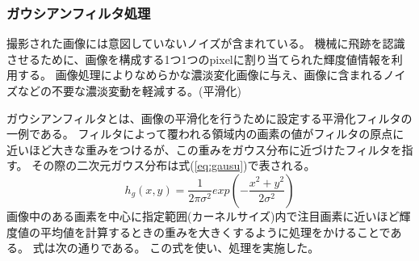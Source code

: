 \documentclass[12pt,a4paper]{jarticle}
\begin{document}
\subsubsection{ガウシアンフィルタ処理}
撮影された画像には意図していないノイズが含まれている。
機械に飛跡を認識させるために、画像を構成する1つ1つのpixelに割り当てられた輝度値情報を利用する。
画像処理によりなめらかな濃淡変化画像に与え、画像に含まれるノイズなどの不要な濃淡変動を軽減する。(平滑化)
\par
ガウシアンフィルタとは、画像の平滑化を行うために設定する平滑化フィルタの一例である。
フィルタによって覆われる領域内の画素の値がフィルタの原点に近いほど大きな重みをつけるが、この重みをガウス分布に近づけたフィルタを指す。
その際の二次元ガウス分布は式(\ref{eq:gausu})で表される。
\begin{equation}
  h_g(x,y) = \frac{1}{2\pi\sigma^2}exp(-\frac{x^2 + y^2}{2\sigma^2})
\label{eq:gausu}
\end{equation}
画像中のある画素を中心に指定範囲(カーネルサイズ)内で注目画素に近いほど輝度値の平均値を計算するときの重みを大きくするように処理をかけることである。
式は次の通りである。
この式を使い、処理を実施した。
\end{document}
